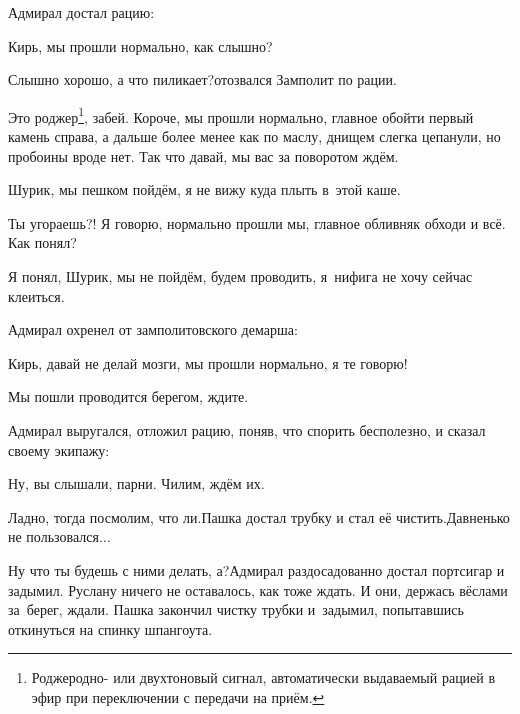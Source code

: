 Адмирал достал рацию:

\diagdash Кирь, мы прошли нормально, как слышно?

\diagdash Слышно хорошо, а что пиликает?\mdash отозвался Замполит по рации.

\renewcommand*{\thefootnote}{\fnsymbol{footnote}}
\setcounter{footnote}{0}
\diagdash Это роджер\footnote{Роджер\mdash одно- или двухтоновый сигнал, автоматически выдаваемый рацией в эфир при переключении с передачи на приём.}, забей. Короче, мы прошли нормально, главное обойти первый камень справа, а дальше более менее как по маслу, днищем слегка цепанули, но пробоины вроде нет. Так что давай, мы вас за поворотом ждём.

\diagdash Шурик, мы пешком пойдём, я не вижу куда плыть в~этой каше.

\diagdash Ты угораешь?! Я говорю, нормально прошли мы, главное обливняк обходи и всё. Как понял?

\diagdash Я понял, Шурик, мы не пойдём, будем проводить, я~нифига не хочу сейчас клеиться.

Адмирал охренел от замполитовского демарша:

\diagdash Кирь, давай не делай мозги, мы прошли нормально, я те говорю!

\diagdash Мы пошли проводится берегом, ждите.

Адмирал выругался, отложил рацию, поняв, что спорить бесполезно, и сказал своему экипажу:

\diagdash Ну, вы слышали, парни. Чилим, ждём их.

\diagdash Ладно, тогда посмолим, что ли.\mdash Пашка достал трубку и стал её чистить.\mdash Давненько не пользовался$\ldots$

\diagdash Ну что ты будешь с ними делать, а?\mdash Адмирал раздосадованно достал портсигар и задымил. Руслану ничего не оставалось, как тоже ждать. И они, держась вёслами за~берег, ждали. Пашка закончил чистку трубки и~задымил, попытавшись откинуться на спинку шпангоута.

